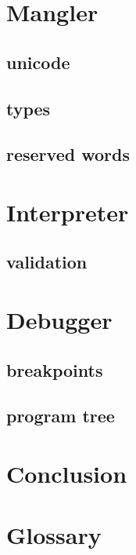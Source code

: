 \documentclass[10pt,a4paper]{article}
\begin{document}
\pagestyle{empty} 


\newpage

\setcounter{page}{1}
\pagestyle{plain}

\begin{multicols}{2}

\tableofcontents
\columnbreak







\section{Mangler}
\subsection{unicode}
\subsection{types}
\subsection{reserved words}

\section{Interpreter}
\subsection{validation}

\section{Debugger}
\subsection{breakpoints}
\subsection{program tree}

\section{Conclusion}

\setcounter{section}{0}
\renewcommand\thesection{\Alph{section}}
\section{Glossary}

\end{multicols}

\printbibliography
\end{document}

